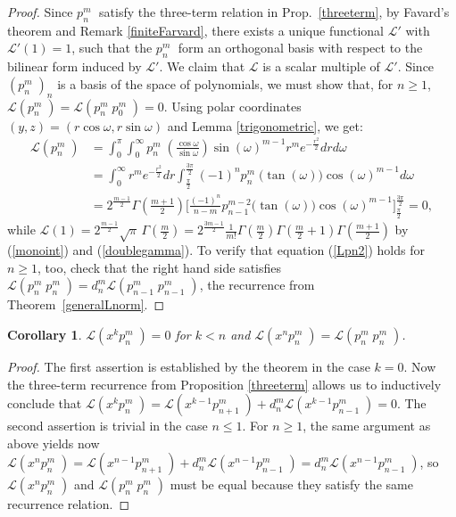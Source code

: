 \documentclass{amsart}
\newcommand{\p}[2]{p_{#1}^{#2}\;\!\!}
\renewcommand{\L}{\mathcal{L}}
\theoremstyle{plain}
\newtheorem{corollary}[theorem]{Corollary}
\theoremstyle{definition}
\theoremstyle{remark}
\begin{document}
\begin{proof}
Since $\p{n}{m}$ satisfy the three-term relation in Prop.~\ref{threeterm}, by Favard's theorem and Remark \ref{finiteFarvard}, there exists a unique functional $\L'$ with $\L'(1)=1$, such that the $\p{n}{m}$ form an orthogonal basis with respect to the bilinear form induced by $\L'$. We claim that $\L$ is a scalar multiple of $\L'$.
Since $(\p{n}{m})_{n} $ is a basis of the space of polynomials, we must show that, for $n\geq 1$, $\L(\p{n}{m}) = \L(\p{n}{m}\p{0}{m}) =0$.
Using polar coordinates $(y,z) = (r\cos\omega,r\sin\omega)$ and Lemma \ref{trigonometric}, we get:
\begin{align*}
\L(\p{n}{m}) &= \int_0^\pi\!\!\int_0^\infty\p{n}{m}\!\left(\tfrac{\cos\omega}{\sin\omega}\right)\sin(\omega)^{m-1} r^m e^{-\frac{r^2}{2}}dr d\omega \\
&=\int_0^\infty r^m e^{-\frac{r^2}{2}}dr \int_{\frac{\pi}{2}}^{\frac{3\pi}{2}} (-1)^n \p{n}{m}\big(\tan(\omega)\big)\cos(\omega)^{m-1}d\omega\\
&= 2^{\frac{m-1}{2}}\Gamma\left(\tfrac{m+1}{2}\right)\Big[\tfrac{(-1)^n}{n-m}p_{n-1}^{m-2}\big(\tan(\omega)\big)\cos(\omega)^{m-1} \Big]_{\frac{\pi}{2}}^{\frac{3\pi}{2}} =0,
\end{align*}
while $\L(1) = 2^{\frac{m-1}{2}}\sqrt{\pi}\,\Gamma\!\left(\frac{m}{2}\right)=2^{\frac{3m-1}{2}}  \frac{1}{m!}
\Gamma\left(\frac{m}{2}\right)\Gamma\left(\frac{m}{2}+1\right)\Gamma\left(\frac{m+1}{2}\right)$ by (\ref{monoint}) and (\ref{doublegamma}). To verify that equation (\ref{Lpn2}) holds for $n\geq 1$, too, check that the right hand side satisfies $\L(\p{n}{m}\p{n}{m}) = d_n^m\L(\p{n-1}{m}\p{n-1}{m})$, the recurrence from Theorem~\ref{generalLnorm}.
\end{proof}
\begin{corollary} \label{pcor}
 $\L(x^{k}\p{n}{m}) = 0$ for $k < n$ and $\L(x^n\p{n}{m})= \L(\p{n}{m}\p{n}{m})$.
\end{corollary}
\begin{proof}
The first assertion is established by the theorem in the case $k=0$. Now the three-term recurrence from Proposition \ref{threeterm} allows us to inductively conclude that $\L(x^k\p{n}{m}) = \L(x^{k-1}\p{n+1}{m})+d_n^m\L(x^{k-1}\p{n-1}{m}) =0$. The second assertion is trivial in the case $n\leq 1$. For $n\geq 1$, the same argument as above yields now $\L(x^n\p{n}{m}) = \L(x^{n-1}\p{n+1}{m})+d_n^m\L(x^{n-1}\p{n-1}{m})=d_n^m\L(x^{n-1}\p{n-1}{m})$, so $\L(x^n\p{n}{m})$ and $\L(\p{n}{m}\p{n}{m})$ must be equal because they satisfy the same recurrence relation.
\end{proof}
\end{document}
